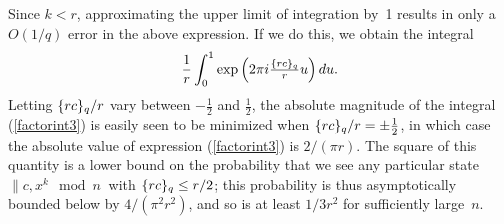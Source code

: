 Since $k < r$, approximating the upper limit of integration by~1 results 
in only a $O(1/q)$ 
error in the above expression.  If we do this, we obtain the integral
\begin{equation}
\frac{1}{r} \int_{0}^{1} 
\exp\left(2\pi i {\textstyle\frac{{\{rc\}_{q}}}{r}}u \right) du.
\label{factorint3}
\end{equation}
Letting ${\{rc\}_{q}}/r$ vary between $-\frac{1}{2}$ and $\frac{1}{2}$,
the absolute magnitude of the integral (\ref{factorint3}) is easily seen
to be minimized when ${\{rc\}_{q}}/{r} = \pm \frac{1}{2}$, in which case 
the absolute value of expression (\ref{factorint3}) is $2/(\pi r)$.
The square of this quantity is a lower bound on
the probability that we see any particular 
state $\|c, x^k\mod{n}\>$ with ${\{rc\}_{q}} \leq r/2$;
this probability is thus asymptotically
bounded below by $4/(\pi^2 r^2)$, and so is at
least $1/3r^2$ for sufficiently large~$n$.  



